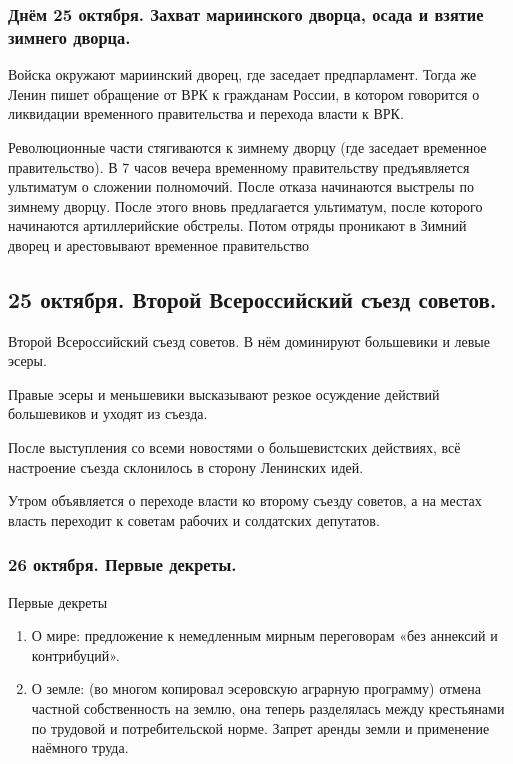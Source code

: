 \subsubsection{\textbf{Днём 25 октября. Захват мариинского дворца, осада и взятие зимнего дворца.}}

Войска окружают мариинский дворец, где заседает предпарламент. Тогда же Ленин пишет обращение от ВРК к гражданам России, в котором говорится о ликвидации временного правительства и перехода власти к ВРК.

Революционные части стягиваются к зимнему дворцу (где заседает временное правительство). В 7 часов вечера временному правительству предъявляется ультиматум о сложении полномочий. После отказа начинаются выстрелы по зимнему дворцу. После этого вновь предлагается ультиматум, после которого начинаются артиллерийские обстрелы. Потом отряды проникают в Зимний дворец и арестовывают временное правительство

\subsection{25 октября. Второй Всероссийский съезд советов.}

Второй Всероссийский съезд советов. В нём доминируют большевики и левые эсеры.

Правые эсеры и меньшевики высказывают резкое осуждение действий большевиков и уходят из съезда.

После выступления со всеми новостями о большевистских действиях, всё настроение съезда склонилось в сторону Ленинских идей.

Утром объявляется о переходе власти ко второму съезду советов, а на местах власть переходит к советам рабочих и солдатских депутатов.

\subsubsection{\textbf{26 октября. Первые декреты.}}

Первые декреты

\begin{enumerate}
    \item О мире: предложение к немедленным мирным переговорам «без аннексий и контрибуций». 
    \item О земле: (во многом копировал эсеровскую аграрную программу) отмена частной собственность на землю, она теперь разделялась между крестьянами по трудовой и потребительской норме. Запрет аренды земли и применение наёмного труда.
\end{enumerate}

